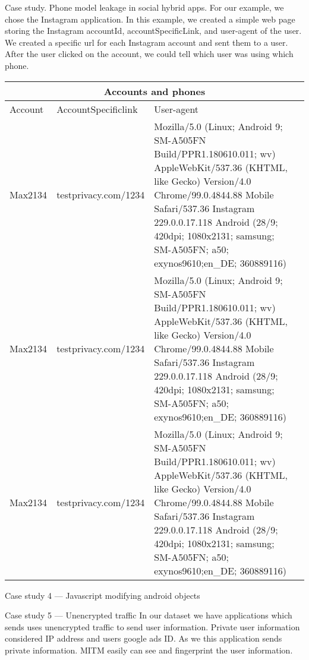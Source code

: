 Case study. Phone model leakage in social hybrid apps.
For our example, we chose the Instagram application. In this example, we created a simple web page storing the Instagram accountId, accountSpecificLink, and user-agent of the user.
 We created a specific url for each Instagram account and sent them to a user. After the user clicked on the account, we could tell which user was using which phone. \\
 \begin{tabular}{ |p{3cm}|p{5cm}|p{5cm}|p{5cm} |}
 \hline
 \multicolumn{4}{|c|}{Accounts and phones} \\
 \hline
Account & AccountSpecificlink & User-agent\\
 \hline
Max2134 & testprivacy.com/1234  & Mozilla/5.0 (Linux; Android 9; SM-A505FN Build/PPR1.180610.011; wv) AppleWebKit/537.36 (KHTML, like Gecko) Version/4.0  Chrome/99.0.4844.88 Mobile Safari/537.36 Instagram 229.0.0.17.118  Android (28/9; 420dpi; 1080x2131;           samsung; SM-A505FN; a50; exynos9610;en\_DE; 360889116) \\ 
 \hline
Max2134 & testprivacy.com/1234  & Mozilla/5.0 (Linux; Android 9; SM-A505FN Build/PPR1.180610.011; wv) AppleWebKit/537.36 (KHTML, like Gecko) Version/4.0  Chrome/99.0.4844.88 Mobile Safari/537.36 Instagram 229.0.0.17.118  Android (28/9; 420dpi; 1080x2131;           samsung; SM-A505FN; a50; exynos9610;en\_DE; 360889116) \\ 
\hline
 \hline
Max2134 & testprivacy.com/1234  & Mozilla/5.0 (Linux; Android 9; SM-A505FN Build/PPR1.180610.011; wv) AppleWebKit/537.36 (KHTML, like Gecko) Version/4.0  Chrome/99.0.4844.88 Mobile Safari/537.36 Instagram 229.0.0.17.118  Android (28/9; 420dpi; 1080x2131;           samsung; SM-A505FN; a50; exynos9610;en\_DE; 360889116) \\ 
 \hline
\end{tabular}
 
 Case study 4 — Javascript modifying android objects
 
 
 Case study 5 — Unencrypted traffic
 In our dataset we have applications which sends uses unencrypted traffic to send user information. Private user information considered IP address and users google ads ID. As we this application sends private information. MITM easily can see and fingerprint the user information. 

 
